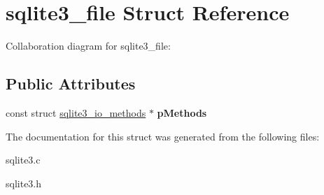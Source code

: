 \hypertarget{structsqlite3__file}{}\section{sqlite3\+\_\+file Struct Reference}
\label{structsqlite3__file}


Collaboration diagram for sqlite3\+\_\+file\+:
\subsection*{Public Attributes}
\begin{DoxyCompactItemize}
\item 
const struct \hyperlink{structsqlite3__io__methods}{sqlite3\+\_\+io\+\_\+methods} $\ast$ {\bfseries p\+Methods}\hypertarget{structsqlite3__file_afbe27b40382393e63784a4d4b43f3ad7}{}\label{structsqlite3__file_afbe27b40382393e63784a4d4b43f3ad7}

\end{DoxyCompactItemize}


The documentation for this struct was generated from the following files\+:\begin{DoxyCompactItemize}
\item 
sqlite3.\+c\item 
sqlite3.\+h\end{DoxyCompactItemize}
